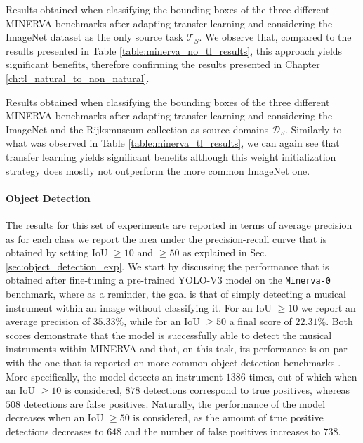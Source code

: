 \begin{table}
	\caption{Results obtained when classifying the bounding boxes of the three different MINERVA benchmarks after adapting transfer learning and considering the ImageNet dataset as the only source task $\mathcal{T}_S$. We observe that, compared to the results presented in Table \ref{table:minerva_no_tl_results}, this approach yields significant benefits, therefore confirming the results presented in Chapter \ref{ch:tl_natural_to_non_natural}.}
\resizebox{\columnwidth}{!}{%
}
\label{table:minerva_tl_results}
\end{table}


\begin{table}
	\caption{Results obtained when classifying the bounding boxes of the three different MINERVA benchmarks after adapting transfer learning and considering the ImageNet and the Rijksmuseum collection as source domains $\mathcal{D}_S$. Similarly to what was observed in Table \ref{table:minerva_tl_results}, we can again see that transfer learning yields significant benefits although this weight initialization strategy does mostly not outperform the more common ImageNet one.}
\resizebox{\columnwidth}{!}{%
}
\label{table:minerva_rijks_results}
\end{table}


\paragraph{Object Detection}
The results for this set of experiments are reported in terms of average precision as for each class we report the area under the precision-recall curve that is obtained by setting IoU $\geq10$ and $\geq50$ as explained in Sec. \ref{sec:object_detection_exp}. We start by discussing the performance that is obtained after fine-tuning a pre-trained YOLO-V3 model on the \texttt{Minerva-0} benchmark, where as a reminder, the goal is that of simply detecting a musical instrument within an image without classifying it. For an IoU $\geq 10$ we report an average precision of $35.33\%$, while for an IoU $\geq 50$ a final score of $22.31\%$. Both scores demonstrate that the model is successfully able to detect the musical instruments within MINERVA and that, on this task, its performance is on par with the one that is reported on more common object detection benchmarks \cite{}. More specifically, the model detects an instrument $1386$ times, out of which when an IoU $\geq 10$ is considered, $878$ detections correspond to true positives, whereas $508$ detections are false positives. Naturally, the performance of the model decreases when an IoU $\geq 50$ is considered, as the amount of true positive detections decreases to $648$ and the number of false positives increases to $738$.

